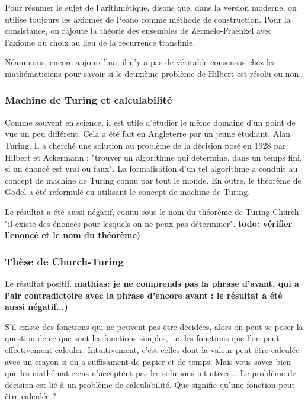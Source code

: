 \documentclass[12pt, a4paper]{article}
\begin{document}

Pour résumer le sujet de l'arithmétique, disons que, dans la version moderne, on utilise toujours les axiomes de Peano comme méthode de construction.
Pour la consistance, on rajoute la théorie des ensembles de Zermelo-Fraenkel avec l'axiome du choix au lieu de la récurrence transfinie.

Néanmoins, encore aujourd'hui, il n'y a pas de véritable consensus chez les mathématiciens pour savoir si le deuxième problème de Hilbert est résolu ou non.

\subsubsection*{Machine de Turing et calculabilité}
Comme souvent en science, il est utile d'étudier le même domaine d'un point de vue un peu différent. Cela a été fait en Angleterre par un jeune étudiant, Alan Turing. Il a cherché une solution au problème de la décision posé en 1928 par Hilbert et Ackermann : "trouver un algorithme qui détermine, dans un temps fini, si un énoncé est vrai ou faux". La formalisation d'un tel algorithme a conduit au concept de machine de Turing connu par tout le monde. En outre, le théorème de Gödel a été reformulé en utilisant le concept de machine de Turing.

Le résultat a été aussi négatif, connu sous le nom du théorème de Turing-Church: "il existe des énoncés pour lesquels on ne peux pas déterminer".
\textbf{todo: vérifier l'enoncé et le nom du théorème)}

\subsubsection*{Thèse de Church-Turing}
Le résultat positif.
\textbf{mathias: je ne comprends pas la phrase d'avant, qui a l'air contradictoire avec la phrase d'encore avant : le résultat a été aussi négatif...)}

S'il existe des fonctions qui ne peuvent pas être décidées, alors on peut se poser la question de ce que sont les fonctions simples, i.e. les fonctions que l'on peut effectivement calculer.
Intuitivement, c'est celles dont la valeur peut être calculée avec un crayon si on a suffisament de papier et de temps.
Mais vous savez bien que les mathématiciens n'acceptent pas les solutions intuitives...
Le problème de décision est lié à un problème de calculabilité. Que signifie qu'une fonction peut être calculée ?
\end{document}
